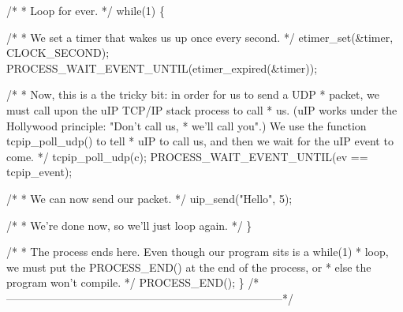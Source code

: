 \begin{DoxyCodeInclude}
  \textcolor{comment}{/*}
\textcolor{comment}{   * Loop for ever.}
\textcolor{comment}{   */}
  \textcolor{keywordflow}{while}(1) \{

    \textcolor{comment}{/*}
\textcolor{comment}{     * We set a timer that wakes us up once every second. }
\textcolor{comment}{     */}
    etimer\_set(&timer, CLOCK\_SECOND);
    PROCESS\_WAIT\_EVENT\_UNTIL(etimer\_expired(&timer));

    \textcolor{comment}{/*}
\textcolor{comment}{     * Now, this is a the tricky bit: in order for us to send a UDP}
\textcolor{comment}{     * packet, we must call upon the uIP TCP/IP stack process to call}
\textcolor{comment}{     * us. (uIP works under the Hollywood principle: "Don't call us,}
\textcolor{comment}{     * we'll call you".) We use the function tcpip\_poll\_udp() to tell}
\textcolor{comment}{     * uIP to call us, and then we wait for the uIP event to come.}
\textcolor{comment}{     */}
    tcpip\_poll\_udp(c);
    PROCESS\_WAIT\_EVENT\_UNTIL(ev == tcpip\_event);

    \textcolor{comment}{/*}
\textcolor{comment}{     * We can now send our packet.}
\textcolor{comment}{     */}
    uip\_send(\textcolor{stringliteral}{"Hello"}, 5);

    \textcolor{comment}{/*}
\textcolor{comment}{     * We're done now, so we'll just loop again.}
\textcolor{comment}{     */}
  \}

  \textcolor{comment}{/*}
\textcolor{comment}{   * The process ends here. Even though our program sits is a while(1)}
\textcolor{comment}{   * loop, we must put the PROCESS\_END() at the end of the process, or}
\textcolor{comment}{   * else the program won't compile.}
\textcolor{comment}{   */}
  PROCESS\_END();
\}
\textcolor{comment}{/*---------------------------------------------------------------------------*/}
\end{DoxyCodeInclude}
 